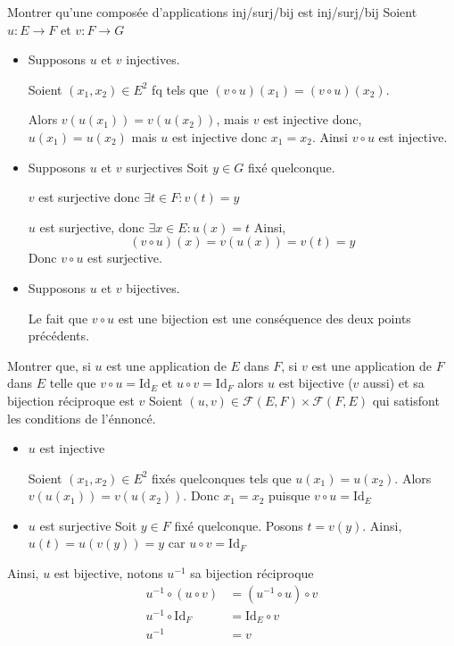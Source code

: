\documentclass{article}
\renewenvironment{question_kholle}[2][ ]
{
	\subsection{\texorpdfstring{#2}{}}
	\notblank{#1}
	{
		\noindent #1
		\bigbreak
	}
	{}
	\begin{proof}
}
{
	\end{proof}
}
\begin{document}
\begin{question_kholle}{Montrer qu'une composée d'applications inj/surj/bij est inj/surj/bij}
  Soient $u : E \to F$ et $v: F \to G$
  \begin{itemize}[label = $\lozenge$]
    \item Supposons $u$ et $v$ injectives.

          Soient $(x_{1}, x_{2}) \in E^{2}$ fq tels que $(v \circ u) (x_{1}) =(v\circ u)(x_{2})$.

          Alors $v(u(x_{1})) = v(u(x_{2}))$, mais $v$ est injective donc, $u(x_{1})= u(x_{2})$ mais $u$ est injective donc $x_{1} = x_{2}$.
          Ainsi $v \circ u$ est injective.
    \item Supposons $u$ et $v$ surjectives
          Soit $y \in G$ fixé quelconque.

          $v$ est surjective donc $\exists t \in F : v(t) = y$

          $u$ est surjective, donc $\exists x \in E : u(x) = t$
          Ainsi,
          $$
            (v \circ u) (x) = v(u(x)) = v(t) = y
          $$
          Donc $v \circ u$ est surjective.

    \item Supposons $u$ et $v$ bijectives.

          Le fait que $v \circ u$ est une bijection est une conséquence des deux points précédents.

  \end{itemize}

\end{question_kholle}
\begin{question_kholle}{Montrer que, si $u$ est une application de $E$ dans $F$, si $v$ est une application de $F$ dans $E$ telle que $v \circ u = \mathrm{Id}_E$ et $u \circ v = \mathrm{Id}_F$ alors $u$ est bijective ($v$ aussi) et sa bijection réciproque est $v$}
  Soient $(u, v) \in \mathcal{F}(E, F) \times \mathcal{F}(F, E)$ qui satisfont les conditions de l'énnoncé.
  \begin{itemize}[label=$\lozenge$]
    \item $u$ est injective

          Soient $(x_{1}, x_{2}) \in E^{2}$ fixés quelconques tels que $u(x_{1}) = u(x_{2})$. Alors $v(u(x_{1})) = v(u(x_{2}))$. Donc $x_{1} = x_{2}$ puisque $v \circ u = \mathrm{Id}_{E}$

    \item $u$ est surjective
          Soit $y \in F$ fixé quelconque. Posons $t = v(y)$. Ainsi, $u(t) = u(v(y))= y$ car $u \circ v = \mathrm{Id}_{F}$


  \end{itemize}
  Ainsi, $u$ est bijective, notons $u^{-1}$ sa bijection réciproque
  \begin{align*}
    u^{-1} \circ (u \circ v )    & = (u^{-1} \circ u) \circ v \\
    u^{-1} \circ \mathrm{Id}_{F} & = \mathrm{Id}_{E}\circ v   \\
    u^{-1}                       & = v
  \end{align*}

\end{question_kholle}
\end{document}
